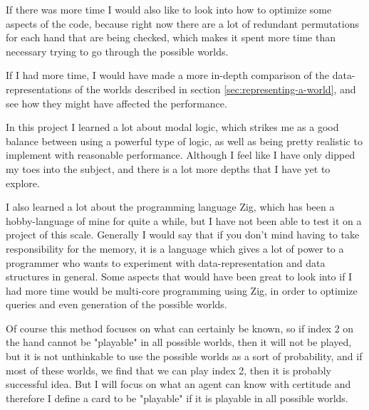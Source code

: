 If there was more time I would also like to look into how to optimize some aspects of the code, because right now there are a lot of redundant permutations for each hand that are being checked, which makes it spent more time than necessary trying to go through the possible worlds.

If I had more time, I would have made a more in-depth comparison of the data-representations of the worlds described in section \ref{sec:representing-a-world}, and see how they might have affected the performance.



In this project I learned a lot about modal logic, which strikes me as a good balance between using a powerful type of logic, as well as being pretty realistic to implement with reasonable performance.
Although I feel like I have only dipped my toes into the subject, and there is a lot more depths that I have yet to explore.

I also learned a lot about the programming language Zig, which has been a hobby-language of mine for quite a while, but I have not been able to test it on a project of this scale.
Generally I would say that if you don't mind having to take responsibility for the memory, it is a language which gives a lot of power to a programmer who wants to experiment with data-representation and data structures in general.
Some aspects that would have been great to look into if I had more time would be multi-core programming using Zig, in order to optimize queries and even generation of the possible worlds.

Of course this method focuses on what can certainly be known, so if index 2 on the hand cannot be "playable" in all possible worlds, then it will not be played, but it is not unthinkable to use the possible worlds as a sort of probability, and if most of these worlds, we find that we can play index 2, then it is probably successful idea.
But I will focus on what an agent can know with certitude and therefore I define a card to be "playable" if it is playable in all possible worlds.


